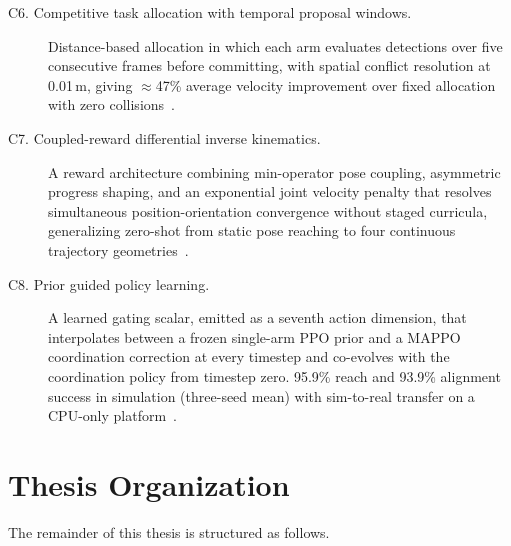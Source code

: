 \begin{description}
    \item[C6. Competitive task allocation with temporal proposal windows.] Distance-based
    allocation in which each arm evaluates detections over five consecutive frames before
    committing, with spatial conflict resolution at 0.01\,m, giving $\approx$47\% average velocity
    improvement over fixed allocation with zero collisions~\citep{sk2025competitive}.

    \item[C7. Coupled-reward differential inverse kinematics.] A reward architecture combining
    min-operator pose coupling, asymmetric progress shaping, and an exponential joint velocity penalty that
    resolves simultaneous position-orientation convergence without staged curricula, generalizing
    zero-shot from static pose reaching to four continuous trajectory
    geometries~\citep{sk2025diktracking}.

    \item[C8. Prior guided policy learning.] A learned gating scalar, emitted as a
    seventh action dimension, that interpolates between a frozen single-arm PPO prior and a MAPPO
    coordination correction at every timestep and co-evolves with the coordination policy from
    timestep zero. 95.9\% reach and 93.9\% alignment success in simulation (three-seed mean) with sim-to-real transfer
    on a CPU-only platform~\citep{sk2026priorguided}.
\end{description}

\section{Thesis Organization}\label{sec:intro_organization}

The remainder of this thesis is structured as follows.

